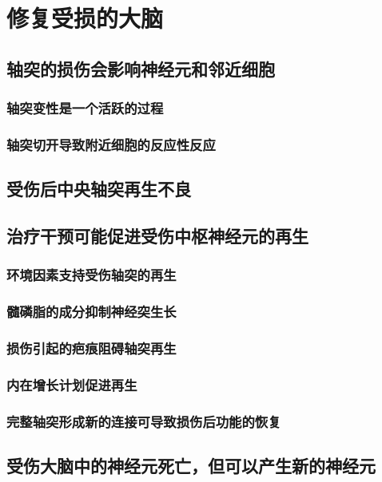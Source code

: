 \chapter{修复受损的大脑}

\section{轴突的损伤会影响神经元和邻近细胞}
\subsection{轴突变性是一个活跃的过程}
\subsection{轴突切开导致附近细胞的反应性反应}

\section{受伤后中央轴突再生不良}

\section{治疗干预可能促进受伤中枢神经元的再生}
\subsection{环境因素支持受伤轴突的再生}
\subsection{髓磷脂的成分抑制神经突生长}
\subsection{损伤引起的疤痕阻碍轴突再生}
\subsection{内在增长计划促进再生}
\subsection{完整轴突形成新的连接可导致损伤后功能的恢复}

\section{受伤大脑中的神经元死亡，但可以产生新的神经元}

